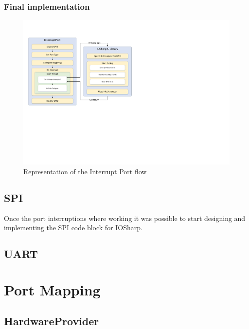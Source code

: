 \subsubsection{Final implementation}\label{SSS:IOSharp-Interrupt-Implementation}

\begin{figure}[H]\begin{center}
 \centering
  \captionsetup{justification=centering}
  \includegraphics[width=1\textwidth]{pictures/iosharp/interrupt-schema}
  \caption{Representation of the Interrupt Port flow \label{fig:interrupt-schema}}
\end{center}\end{figure}

\subsection{SPI}\label{SS:IOSharp-SPI}
Once the port interruptions where working it was possible to start designing and implementing the SPI code block for IOSharp.
\subsection{UART}\label{SS:IOSharp-UART}


\section{Port Mapping}\label{S:Port-Mapping}
\subsection{HardwareProvider}\label{SS:HardwareProvider}



